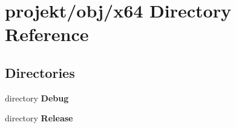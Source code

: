 \section{projekt/obj/x64 Directory Reference}
\label{dir_13b5e762b4d7fd77e0d7911dcdf9438b}
\subsection*{Directories}
\begin{DoxyCompactItemize}
\item 
directory \textbf{ Debug}
\item 
directory \textbf{ Release}
\end{DoxyCompactItemize}
